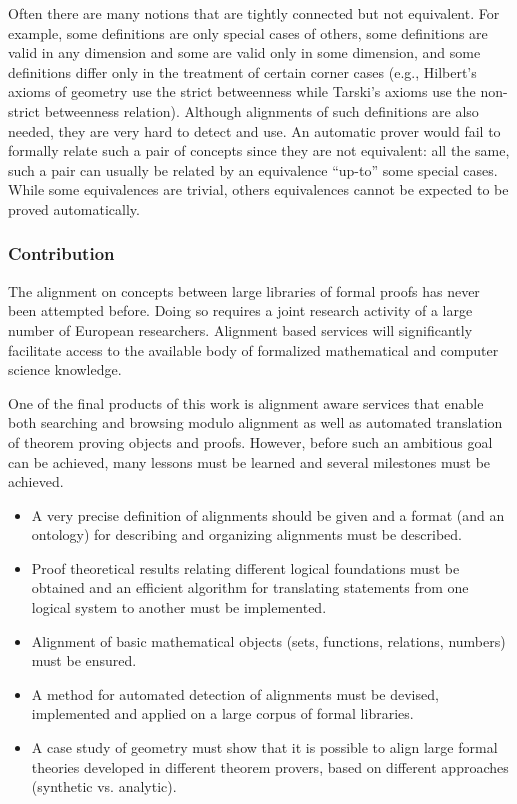 Often there are many notions that are tightly connected but not
equivalent.
%
For example, some definitions are only special cases of others,
some definitions are valid in any dimension and some
are valid only in some dimension, and some definitions differ
only in the treatment of certain corner cases (e.g., Hilbert's axioms of
geometry use the strict betweenness while Tarski's axioms use the
non-strict betweenness relation).  Although alignments of such
definitions are also needed, they are very hard to detect and use. An
automatic prover would fail to formally relate such a pair of concepts
since they are not equivalent: all the same, such a pair can usually
be related by an equivalence ``up-to'' some special cases.  While some
equivalences are trivial, others equivalences cannot be expected to be
proved automatically.

\subsubsection*{Contribution}

The alignment on concepts between large libraries of formal proofs has
never been attempted before.  Doing so requires a joint research
activity of a large number of European researchers.  Alignment based
services will significantly
facilitate access to the available body of formalized mathematical and
computer science knowledge.

One of the final products of this work is alignment aware services
that enable both searching and browsing modulo alignment as well as
automated translation of theorem proving objects and proofs.  However,
before such an ambitious goal can be achieved, many lessons must be
learned and several milestones must be achieved.
\begin{itemize}
\item A very precise definition of alignments should be given and a
  format (and an ontology) for describing and organizing alignments
  must be described.
\item Proof theoretical results relating different logical foundations
  must be obtained and an efficient algorithm for translating
  statements from one logical system to another must be implemented.
\item Alignment of basic mathematical objects (sets, functions,
  relations, numbers) must be ensured.
\item A method for automated detection of alignments must be devised,
  implemented and applied on a large corpus of formal libraries.
\item A case study of geometry must show that it is possible to align
  large formal theories developed in different theorem provers, based
  on different approaches (synthetic vs. analytic).
\end{itemize}

